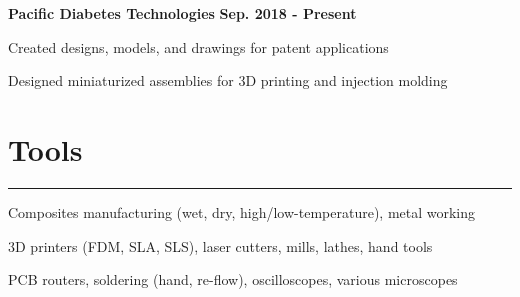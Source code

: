 {\textbf{Pacific Diabetes Technologies}}
{\hfill \textbf{Sep. 2018 - Present}}
\begin{innerlist}
	\item Created designs, models, and drawings for patent applications
	\item Designed miniaturized assemblies for 3D printing and injection molding
\end{innerlist}
\vfill
\section{Tools}

\noindent\rule{\textwidth}{\hlinewidth}
    \begin{innerlist}
    \item Composites manufacturing (wet, dry, high/low-temperature), metal working
    \item 3D printers (FDM, SLA, SLS), laser cutters, mills, lathes, hand tools
    \item PCB routers, soldering (hand, re-flow), oscilloscopes, various microscopes
    \end{innerlist}
\vfill
